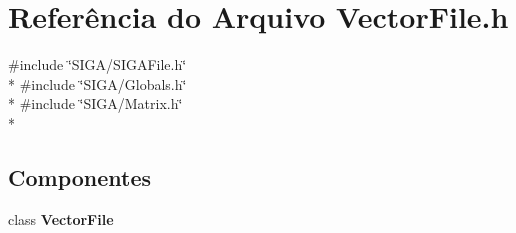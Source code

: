\section{Referência do Arquivo Vector\+File.\+h}
\label{_vector_file_8h}
{\ttfamily \#include \char`\"{}S\+I\+G\+A/\+S\+I\+G\+A\+File.\+h\char`\"{}}\\*
{\ttfamily \#include \char`\"{}S\+I\+G\+A/\+Globals.\+h\char`\"{}}\\*
{\ttfamily \#include \char`\"{}S\+I\+G\+A/\+Matrix.\+h\char`\"{}}\\*
\subsection*{Componentes}
\begin{DoxyCompactItemize}
\item 
class {\bf Vector\+File}
\end{DoxyCompactItemize}
